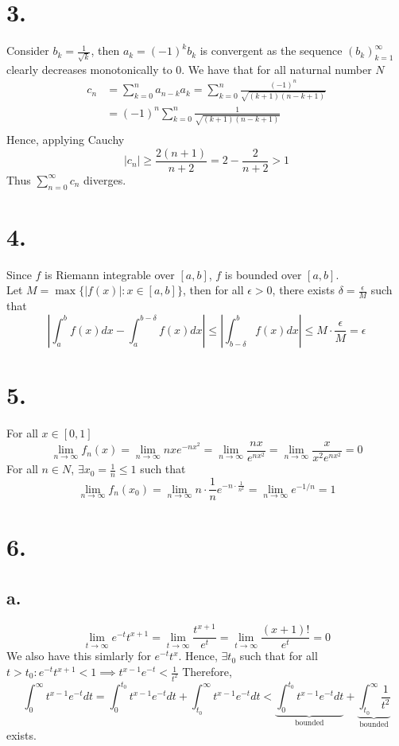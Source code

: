 \documentclass[11pt]{article}
\begin{document}
\section*{3.}
Consider $b_k = \frac{1}{\sqrt{k}}$, then $a_k = (-1)^k b_k$ is convergent as the sequence $(b_k)_{k=1}^\infty$ clearly decreases monotonically to 0.
We have that for all naturnal number $N$
\begin{equation*}
    \begin{aligned}
        c_n &= \sum_{k=0}^n a_{n-k}a_k = \sum_{k=0}^n \frac{(-1)^n}{\sqrt{(k+1)(n-k+1)}} \\
        & = (-1)^n \sum_{k=0}^n \frac{1}{\sqrt{(k+1)(n-k+1)}} \\
    \end{aligned}
\end{equation*}
Hence, applying Cauchy 
\[
    |c_n| \ge \frac{2(n+1)}{n+2}  = 2 - \frac{2}{n+2} > 1 
\]
Thus $\sum_{n=0}^\infty c_n$ diverges.
\pagebreak
\section*{4.}
Since $f$ is Riemann integrable over $[a,b]$, $f$ is bounded over $[a,b]$. \\
Let $M = \max\{|f(x)|: x \in [a,b]\}$, then for all $\epsilon >0$, 
there exists $\delta = \frac{\epsilon}{M}$ such that 
\[
    \left|\int_a^{b} f(x) dx - \int_a^{b - \delta} f(x) dx \right| \le \left|\int_{b-\delta}^b f(x) dx \right| \le M \cdot \frac{\epsilon}{M} = \epsilon 
\]
\pagebreak
\section*{5.}
For all $x \in [0,1]$
\[
    \lim_{n \to \infty} f_n(x) = \lim_{n \to \infty} nxe^{-nx^2} = \lim_{n \to \infty} \frac{nx}{e^{nx^2}} = \lim_{n \to \infty} \frac{x}{x^2 e^{nx^2}} = 0
\]
For all $n \in N$, $\exists x_0 = \frac{1}{n} \le 1$ such that 
\[
    \lim_{n \to \infty} f_n(x_0) = \lim_{n \to \infty} n \cdot \frac{1}{n} e^{-n \cdot \frac{1}{n^2}} = \lim_{n \to \infty} e^{-1/n} = 1
\]
\pagebreak
\section*{6.}
\subsection*{a.}
\[
    \lim_{t \to \infty} e^{-t} t^{x+1} = \lim_{t \to \infty} \frac{t^{x+1}}{e^t} = \lim_{t \to \infty} \frac{(x+1)!}{e^t} = 0   
\]
We also have this simlarly for $e^{-t}t^x$. Hence, $\exists t_0$ such that for all $t > t_0: e^{-t}t^{x+1} < 1 \implies t^{x-1} e^{-t} < \frac{1}{t^2}$
Therefore, 
\[
    \int_0^\infty t^{x-1}e^{-t}dt = \int_0^{t_0} t^{x-1}e^{-t}dt + \int_{t_0}^\infty t^{x-1}e^{-t} dt < \underbrace{\int_0^{t_0}  t^{x-1}e^{-t}dt}_{\text{bounded}} + \underbrace{\int_{t_0}^\infty \frac{1}{t^2}}_{\text{bounded}}
\]
exists.
\end{document}

